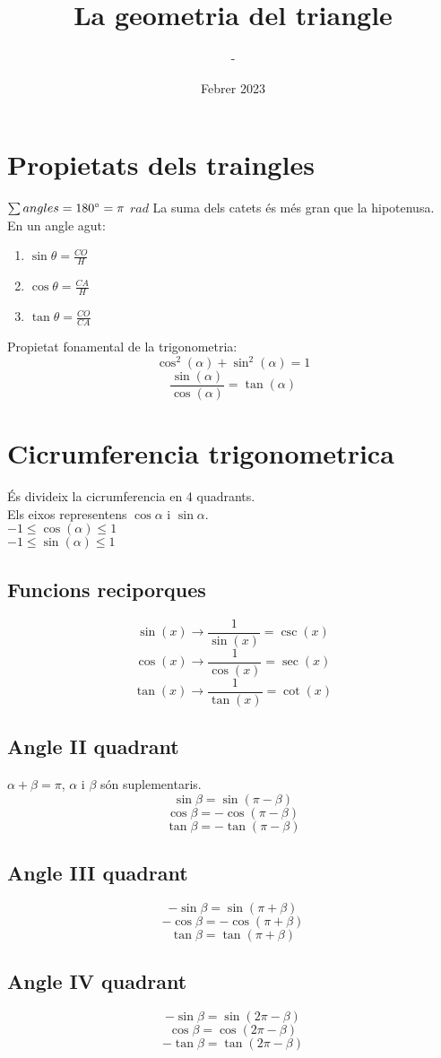\documentclass[12pt,a4paper]{article}
\title{La geometria del triangle}
\author{-}
\date{Febrer 2023}
\begin{document}
\maketitle
\section{Propietats dels traingles}

$\sum angles = 180\degree = \pi$ $rad$
La suma dels catets és més gran que la hipotenusa.\\
En un angle agut:
\begin{enumerate}[label= ]
    \item $\sin\theta=\frac{CO}{H}$
    \item $\cos\theta=\frac{CA}{H}$
    \item $\tan\theta=\frac{CO}{CA}$
\end{enumerate}
Propietat fonamental de la trigonometria:
$$\cos^2(\alpha)+\sin^2(\alpha)=1$$
$$\frac{\sin(\alpha)}{\cos(\alpha)}=\tan(\alpha)$$
\section{Cicrumferencia trigonometrica}
És divideix la cicrumferencia en 4 quadrants.\\
Els eixos representens $\cos\alpha$ i $\sin\alpha$.\\
$-1\leq\cos(\alpha)\leq 1$ \\ $-1\leq\sin(\alpha)\leq 1$ 
\subsection{Funcions reciporques}
$$\sin(x)\rightarrow\frac{1}{\sin(x)}=\csc(x)$$
$$\cos(x)\rightarrow\frac{1}{\cos(x)}=\sec(x)$$
$$\tan(x)\rightarrow\frac{1}{\tan(x)}=\cot(x)$$
\subsection{Angle II quadrant}
$\alpha + \beta = \pi$, $\alpha$ i $\beta$ són suplementaris.
$$\sin \beta = \sin(\pi - \beta)$$
$$\cos \beta = -\cos(\pi-\beta)$$
$$\tan \beta = -\tan(\pi-\beta)$$
\subsection{Angle III quadrant}
$$-\sin \beta = \sin(\pi + \beta)$$
$$-\cos \beta = -\cos(\pi+\beta)$$
$$\tan \beta = \tan(\pi+\beta)$$
\subsection{Angle IV quadrant}
$$-\sin \beta = \sin(2\pi - \beta)$$
$$\cos \beta = \cos(2\pi-\beta)$$
$$-\tan \beta = \tan(2\pi-\beta)$$
\end{document}
